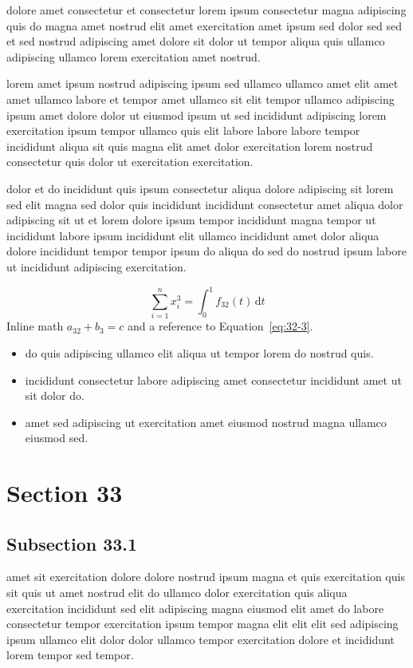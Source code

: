 \documentclass{article}
\begin{document}
dolore amet consectetur et consectetur lorem ipsum consectetur magna adipiscing quis do magna amet nostrud elit amet exercitation amet ipsum sed dolor sed sed et sed nostrud adipiscing amet dolore sit dolor ut tempor aliqua quis ullamco adipiscing ullamco lorem exercitation amet nostrud.

lorem amet ipsum nostrud adipiscing ipsum sed ullamco ullamco amet elit amet amet ullamco labore et tempor amet ullamco sit elit tempor ullamco adipiscing ipsum amet dolore dolor ut eiusmod ipsum ut sed incididunt adipiscing lorem exercitation ipsum tempor ullamco quis elit labore labore labore tempor incididunt aliqua sit quis magna elit amet dolor exercitation lorem nostrud consectetur quis dolor ut exercitation exercitation.

dolor et do incididunt quis ipsum consectetur aliqua dolore adipiscing sit lorem sed elit magna sed dolor quis incididunt incididunt consectetur amet aliqua dolor adipiscing sit ut et lorem dolore ipsum tempor incididunt magna tempor ut incididunt labore ipsum incididunt elit ullamco incididunt amet dolor aliqua dolore incididunt tempor tempor ipsum do aliqua do sed do nostrud ipsum labore ut incididunt adipiscing exercitation.

\begin{equation}\label{eq:32-3}
  \sum_{i=1}^{n} x_i^{3} = \int_0^1 f_{32}(t)\,\mathrm{d}t
\end{equation}
Inline math $a_{32} + b_{3} = c$ and a reference to Equation~\eqref{eq:32-3}.

\begin{itemize}
  \item do quis adipiscing ullamco elit aliqua ut tempor lorem do nostrud quis.
  \item incididunt consectetur labore adipiscing amet consectetur incididunt amet ut sit dolor do.
  \item amet sed adipiscing ut exercitation amet eiusmod nostrud magna ullamco eiusmod sed.
\end{itemize}

\section{Section 33}\label{sec:33}
\subsection{Subsection 33.1}\label{sec:33-1}
amet sit exercitation dolore dolore nostrud ipsum magna et quis exercitation quis sit quis ut amet nostrud elit do ullamco dolor exercitation quis aliqua exercitation incididunt sed elit adipiscing magna eiusmod elit amet do labore consectetur tempor exercitation ipsum tempor magna elit elit elit sed adipiscing ipsum ullamco elit dolor dolor ullamco tempor exercitation dolore et incididunt lorem tempor sed tempor.
\end{document}
